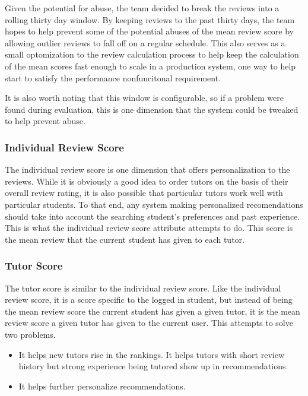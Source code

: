 Given the potential for abuse, the team decided to break the reviews into a
rolling thirty day window. By keeping reviews to the past thirty days, the team
hopes to help prevent some of the potential abuses of the mean review score by
allowing outlier reviews to fall off on a regular schedule. This also serves as
a small optomization to the review calculation process to help keep the
calculation of the mean scores fast enough to scale in a production system, one
way to help start to satisfy the performance nonfuncitonal requirement.

It is also worth noting that this window is configurable, so if a problem were
found during evaluation, this is one dimension that the system could be
tweaked to help prevent abuse.

\subsubsection{Individual Review Score}
The individual review score is one dimension that offers personalization to
the reviews.  While it is obviously a good idea to order tutors on the basis
of their overall review rating, it is also possible that particular tutors
work well with particular students.  To that end, any system making
personalized recomendations should take into account the searching student's
preferences and past experience.  This is what the individual review score
attribute attempts to do.  This score is the mean review that the current
student has given to each tutor.  

\subsubsection{Tutor Score} %

The tutor score is similar to the individual review score.  Like the
individual review score, it is a score specific to the logged in student, but
instead of being the mean review score the current student has given a given
tutor, it is the mean review score a given tutor has given to the current
user.  This attempts to solve two problems.

\begin{itemize}
\item It helps new tutors rise in the rankings.
  It helps tutors with short review history but strong experience being
  tutored show up in recommendations.
\item It helps further personalize recommendations.
\end{itemize}

